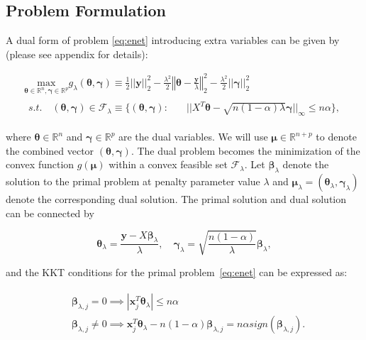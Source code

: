 \subsection{Problem Formulation}

A dual form of problem \eqref{eq:enet} introducing extra variables can be given by (please see appendix for details):

\begin{gather}
        \label{eq:dualtheta}
        \underset{\boldsymbol\theta\in \mathbb{R}^{ n},\boldsymbol\gamma\in\mathbb{R}^p}{\mathrm{max}}g_\lambda(\boldsymbol\theta,\boldsymbol\gamma)\equiv\frac{1}{2}||\boldsymbol y||_2^2-\frac{\lambda^2}{2}\left\Vert\boldsymbol\theta-\frac{\boldsymbol y}{\lambda}\right\Vert_2^2-\frac{\lambda^2}{2}||\boldsymbol\gamma||_2^2\\
        \begin{aligned}s.t.\quad (\boldsymbol\theta,\boldsymbol\gamma)\in \mathcal{F}_\lambda\equiv\{(\boldsymbol\theta,\boldsymbol\gamma):\quad
            &||X^T\boldsymbol\theta-\sqrt{n(1-\alpha)\lambda}\boldsymbol\gamma||_\infty\leq n\alpha\}\nonumber,
        \end{aligned}
\end{gather}

where $\boldsymbol\theta\in \mathbb{R}^{n}$ and $\boldsymbol\gamma\in\mathbb{R}^p$ are the dual variables. We will use $\boldsymbol\mu\in \mathbb{R}^{n+p}$ to denote the combined vector $(\boldsymbol \theta,\boldsymbol\gamma)$. The dual problem becomes the minimization of the convex function $g(\boldsymbol\mu)$ within a convex feasible set $\mathcal{F}_\lambda$. Let $\boldsymbol\beta_\lambda$ denote the solution to the primal problem at penalty parameter value $\lambda$ and $\boldsymbol\mu_{\lambda}=(\boldsymbol\theta_{\lambda},\boldsymbol\gamma_\lambda)$ denote the corresponding dual solution. The primal solution and dual solution can be connected by

\begin{equation}
    \label{eq:dualprimal}
    \boldsymbol\theta_\lambda=\frac{\boldsymbol y-X\boldsymbol\beta_\lambda}{\lambda},\quad \boldsymbol\gamma_\lambda=\sqrt{\frac{n(1-\alpha)}{\lambda}}\boldsymbol\beta_\lambda,
\end{equation}

and the KKT conditions for the primal problem~\eqref{eq:enet} can be expressed as:

\begin{gather}
    \label{eq:kktenet}
    \begin{aligned}&\boldsymbol\beta_{\lambda,j}=0\implies|\boldsymbol x_j^T\boldsymbol\theta_\lambda|\leq n\alpha\\
    & \boldsymbol\beta_{\lambda,j}\neq0\implies  \boldsymbol x_j^T\boldsymbol\theta_\lambda-n(1-\alpha)\boldsymbol\beta_{\lambda,j}=n\alpha\textit{sign}(\boldsymbol\beta_{\lambda,j}).
    \end{aligned}
\end{gather}

